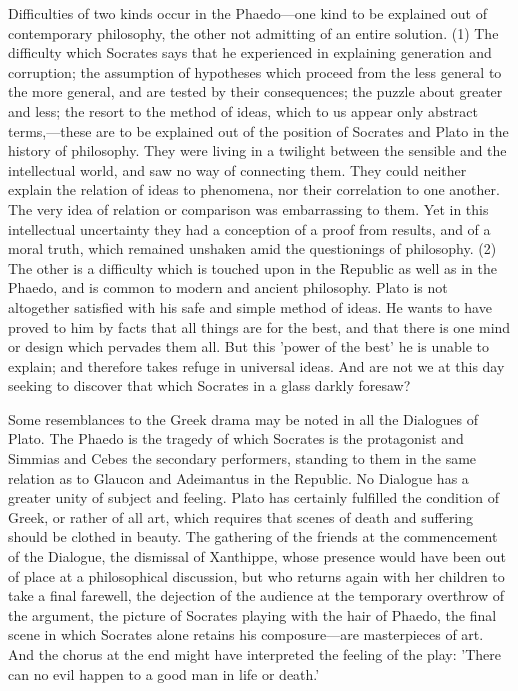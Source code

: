 Difficulties of two kinds occur in the Phaedo—one kind to be
explained out of contemporary philosophy, the other not admitting of an
entire solution. (1) The difficulty which Socrates says that he
experienced in explaining generation and corruption; the assumption of
hypotheses which proceed from the less general to the more general, and
are tested by their consequences; the puzzle about greater and less; the
resort to the method of ideas, which to us appear only abstract terms,—these
are to be explained out of the position of Socrates and Plato in the
history of philosophy. They were living in a twilight between the sensible
and the intellectual world, and saw no way of connecting them. They could
neither explain the relation of ideas to phenomena, nor their correlation
to one another. The very idea of relation or comparison was embarrassing
to them. Yet in this intellectual uncertainty they had a conception of a
proof from results, and of a moral truth, which remained unshaken amid the
questionings of philosophy. (2) The other is a difficulty which is touched
upon in the Republic as well as in the Phaedo, and is common to modern and
ancient philosophy. Plato is not altogether satisfied with his safe and
simple method of ideas. He wants to have proved to him by facts that all
things are for the best, and that there is one mind or design which
pervades them all. But this 'power of the best' he is unable to explain;
and therefore takes refuge in universal ideas. And are not we at this day
seeking to discover that which Socrates in a glass darkly foresaw?

Some resemblances to the Greek drama may be noted in all the Dialogues of
Plato. The Phaedo is the tragedy of which Socrates is the protagonist and
Simmias and Cebes the secondary performers, standing to them in the same
relation as to Glaucon and Adeimantus in the Republic. No Dialogue has a
greater unity of subject and feeling. Plato has certainly fulfilled the
condition of Greek, or rather of all art, which requires that scenes of
death and suffering should be clothed in beauty. The gathering of the
friends at the commencement of the Dialogue, the dismissal of Xanthippe,
whose presence would have been out of place at a philosophical discussion,
but who returns again with her children to take a final farewell, the
dejection of the audience at the temporary overthrow of the argument, the
picture of Socrates playing with the hair of Phaedo, the final scene in
which Socrates alone retains his composure—are masterpieces of art.
And the chorus at the end might have interpreted the feeling of the play:
'There can no evil happen to a good man in life or death.'

